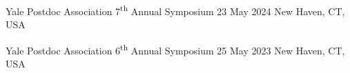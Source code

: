 



\begin{cventries}
  \cventry
    {Yale Postdoc Association} %
    {7\textsuperscript{th} Annual Symposium} %
    {23 May 2024} %
    {New Haven, CT, USA} %
    {}

  \cventry
    {Yale Postdoc Association} %
    {6\textsuperscript{th} Annual Symposium} %
    {25 May 2023} %
    {New Haven, CT, USA} %
    {}
\end{cventries}


